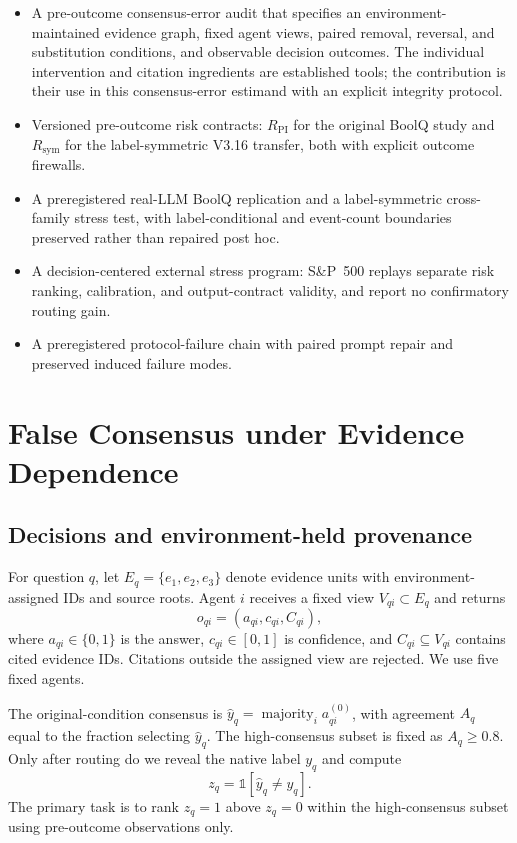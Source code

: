 \documentclass[11pt]{article}
\newcommand{\rpi}{R_{\mathrm{PI}}}
\begin{document}
\begin{itemize}
    \item A pre-outcome consensus-error audit that specifies an environment-maintained evidence graph, fixed agent views, paired removal, reversal, and substitution conditions, and observable decision outcomes. The individual intervention and citation ingredients are established tools; the contribution is their use in this consensus-error estimand with an explicit integrity protocol.
    \item Versioned pre-outcome risk contracts: $\rpi$ for the original BoolQ study and $R_{\mathrm{sym}}$ for the label-symmetric V3.16 transfer, both with explicit outcome firewalls.
    \item A preregistered real-LLM BoolQ replication and a label-symmetric cross-family stress test, with label-conditional and event-count boundaries preserved rather than repaired post hoc.
    \item A decision-centered external stress program: S\&P~500 replays separate risk ranking, calibration, and output-contract validity, and report no confirmatory routing gain.
    \item A preregistered protocol-failure chain with paired prompt repair and preserved induced failure modes.
\end{itemize}

\section{False Consensus under Evidence Dependence}

\subsection{Decisions and environment-held provenance}

For question $q$, let $E_q=\{e_1,e_2,e_3\}$ denote evidence units with environment-assigned IDs and source roots. Agent $i$ receives a fixed view $V_{qi}\subset E_q$ and returns
\begin{equation}
o_{qi}=(a_{qi},c_{qi},C_{qi}),
\end{equation}
where $a_{qi}\in\{0,1\}$ is the answer, $c_{qi}\in[0,1]$ is confidence, and $C_{qi}\subseteq V_{qi}$ contains cited evidence IDs. Citations outside the assigned view are rejected. We use five fixed agents.

The original-condition consensus is $\hat y_q=\operatorname{majority}_i a_{qi}^{(0)}$, with agreement $A_q$ equal to the fraction selecting $\hat y_q$. The high-consensus subset is fixed as $A_q\geq0.8$. Only after routing do we reveal the native label $y_q$ and compute
\begin{equation}
z_q=\mathbb{1}[\hat y_q\neq y_q].
\end{equation}
The primary task is to rank $z_q=1$ above $z_q=0$ within the high-consensus subset using pre-outcome observations only.
\end{document}
